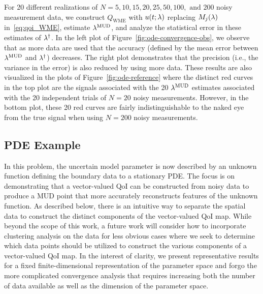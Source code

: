 For 20 different realizations of $N=5, 10, 15, 20, 25, 50, 100, \text{ and } 200$ noisy measurement data, we construct $Q_\text{WME}$ with $u(t;\lambda)$ replacing $M_j(\lambda)$ in~\eqref{eq:qoi_WME}, estimate $\lambda^{\text{MUD}}$, and analyze the statistical error in these estimates of $\lambda^\dagger$.
In the left plot of Figure~\ref{fig:ode-convergence-obs}, we observe that as more data are used that the accuracy (defined by the mean error between $\lambda^{\text{MUD}}$ and $\lambda^\dagger$) decreases.
The right plot demonstrates that the precision (i.e., the variance in the error) is also reduced by using more data.
These results are also visualized in the plots of Figure~\ref{fig:ode-reference} where the distinct red curves in the top plot are the signals associated with the 20 $\lambda^{\text{MUD}}$ estimates associated with the 20 independent trials of $N=20$ noisy measurements.
However, in the bottom plot, these 20 red curves are fairly indistinguishable to the naked eye from the true signal when using $N=200$ noisy measurements.

\FloatBarrier
\subsection{PDE Example}\label{subsec:pde-example}

In this problem, the uncertain model parameter is now described by an unknown function defining the boundary data to a stationary PDE.
The focus is on demonstrating that a vector-valued QoI can be constructed from noisy data to produce a MUD point that more accurately reconstructs features of the unknown function.
As described below, there is an intuitive way to separate the spatial data to construct the distinct components of the vector-valued QoI map.
While beyond the scope of this work, a future work will consider how to incorporate clustering analysis on the data for less obvious cases where we seek to determine which data points should be utilized to construct the various components of a vector-valued QoI map.
In the interest of clarity, we present representative results for a fixed finite-dimensional representation of the parameter space and forgo the more complicated convergence analysis that requires increasing both the number of data available as well as the dimension of the parameter space.

